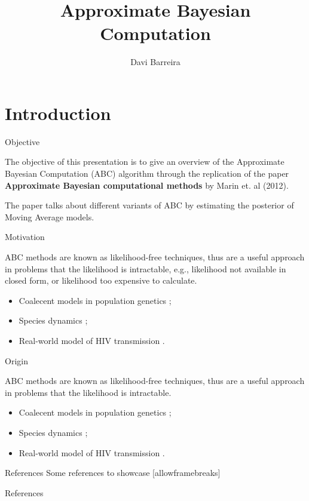 \documentclass[10pt]{beamer}
\title{Approximate Bayesian Computation}
\subtitle{}
\date{}
\author{Davi Barreira}
\institute{FGV - Escola de Matemática Aplicada}
\begin{document}
\maketitle


\section[Introduction]{Introduction}
\begin{frame}[fragile]{Objective}

  The objective of this presentation is to give an overview of
  the Approximate Bayesian Computation (ABC) algorithm through the
  replication of the
  paper \textbf{Approximate Bayesian computational methods} by
  Marin et. al (2012).

  The paper talks about different variants of ABC by estimating the
  posterior of Moving Average models.

\end{frame}

\begin{frame}[fragile]{Motivation}

  ABC methods are known as likelihood-free techniques, thus are
  a useful approach in problems that the likelihood is intractable, e.g., likelihood not available in
  closed form, or likelihood too expensive to calculate.
  \begin{itemize}
    \item Coalecent models in population genetics \cite{Tavare505};
    \item Species dynamics \cite{Jabot2016};
    \item Real-world model of HIV transmission \cite{McKinley2018}.
  \end{itemize}

\end{frame}

\begin{frame}[fragile]{Origin}

  ABC methods are known as likelihood-free techniques, thus are
  a useful approach in problems that the likelihood is intractable.
  \begin{itemize}
    \item Coalecent models in population genetics \cite{Tavare505};
    \item Species dynamics \cite{Jabot2016};
    \item Real-world model of HIV transmission \cite{McKinley2018}.
  \end{itemize}

\end{frame}

\begin{frame}{References}
  Some references to showcase [allowframebreaks] \cite{Marin2012}
\end{frame}


\begin{frame}[allowframebreaks]{References}

  
  

\end{frame}
\end{document}
